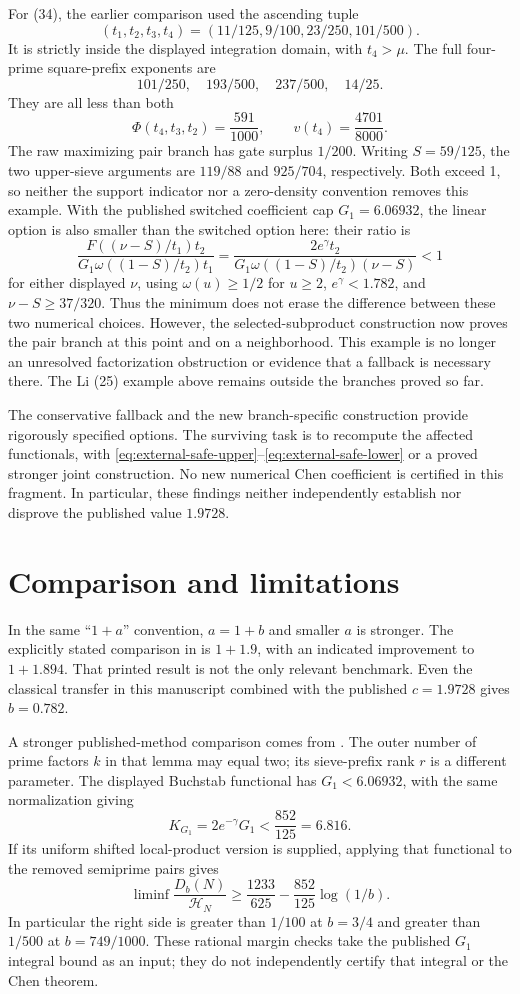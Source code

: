 \documentclass[11pt]{article}
\newcommand{\HN}{\mathcal H_N}
\begin{document}
For (34), the earlier comparison used the ascending tuple
\[
 (t_1,t_2,t_3,t_4)=(11/125,9/100,23/250,101/500).
\]
It is strictly inside the displayed integration domain, with
$t_4>\mu$. The full four-prime square-prefix exponents are
\[
 101/250,\quad193/500,\quad237/500,\quad14/25.
\]
They are all less than both
\[
 \Phi(t_4,t_3,t_2)=\frac{591}{1000},\qquad
 v(t_4)=\frac{4701}{8000}.
\]
The raw maximizing pair branch has gate surplus $1/200$.
Writing $S=59/125$, the two upper-sieve arguments are
$119/88$ and $925/704$, respectively. Both exceed 1, so neither
the support indicator nor a zero-density convention removes
this example. With the published switched coefficient cap
$G_1=6.06932$, the linear option is also smaller than the
switched option here: their ratio is
\[
 \frac{F((\nu-S)/t_1)t_2}
 {G_1\omega((1-S)/t_2)t_1}
 =\frac{2e^\gamma t_2}{G_1\omega((1-S)/t_2)(\nu-S)}<1
\]
for either displayed $\nu$, using
$\omega(u)\ge1/2$ for $u\ge2$, $e^\gamma<1.782$, and
$\nu-S\ge37/320$. Thus the minimum does not erase the difference
between these two numerical choices. However, the selected-subproduct
construction now proves the pair branch at this point and on a
neighborhood. This example is no longer an unresolved factorization
obstruction or evidence that a fallback is necessary there.
The Li (25) example above remains outside the branches proved so far.

The conservative fallback and the new branch-specific construction
provide rigorously specified options. The surviving task is to recompute
the affected functionals, with
\eqref{eq:external-safe-upper}--\eqref{eq:external-safe-lower}
or a proved stronger joint construction. No new numerical
Chen coefficient is certified in this fragment. In particular,
these findings neither independently establish nor disprove
the published value $1.9728$.

\section{Comparison and limitations}
In the same ``$1+a$'' convention, $a=1+b$ and smaller $a$ is stronger.
The explicitly stated comparison in \cite[Theorem 1.1 and its following
remark]{LiLiu2026} is $1+1.9$, with an indicated improvement to
$1+1.894$. That printed result is not the only relevant benchmark.
Even the classical transfer in this manuscript combined with the
published $c=1.9728$ gives $b=0.782$.

A stronger published-method comparison comes from
\cite[Lemma 2.2 and (27)--(29)]{Li2026}. The outer number of prime
factors $k$ in that lemma may equal two; its sieve-prefix rank $r$
is a different parameter. The displayed Buchstab functional has
$G_1<6.06932$, with the same normalization giving
\[
 K_{G_1}=2e^{-\gamma}G_1<\frac{852}{125}=6.816.
\]
If its uniform shifted local-product version is supplied, applying
that functional to the removed semiprime pairs gives
\[
 \liminf\frac{D_b(N)}{\HN}
 \ge\frac{1233}{625}-\frac{852}{125}\log(1/b).
\]
In particular the right side is greater than $1/100$ at $b=3/4$
and greater than $1/500$ at $b=749/1000$. These rational margin
checks take the published $G_1$ integral bound as an input; they do
not independently certify that integral or the Chen theorem.
\end{document}
